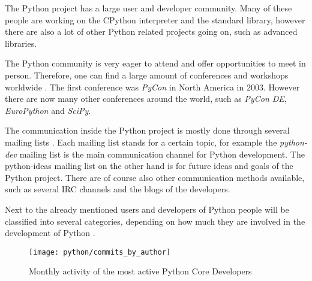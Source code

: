 The Python project has a large user and developer community. Many of these people are
working on the CPython interpreter and the standard library, however there are
also a lot of other Python related projects going on, such as advanced libraries.

The Python community is very eager to attend and offer opportunities to meet in
person. Therefore, one can find a large amount of conferences and workshops
worldwide \cite{PythonConferences}. The first conference was \emph{PyCon} in
North America in 2003. However there are now many other conferences around the
world, such as \emph{PyCon DE}, \emph{EuroPython} and \emph{SciPy}.

The communication inside the Python project is mostly done through several
mailing lists \cite{PythonCommunication}. Each mailing list stands for a
certain topic, for example the \emph{python-dev} mailing list is the main
communication channel for Python development. The python-ideas mailing list on
the other hand is for future ideas and goals of the Python project. There are
of course also other communication methods available, such as several \ac{IRC}
channels and the blogs of the developers.

Next to the already mentioned users and developers of Python people will be
classified into several categories, depending on how much they are involved in
the development of Python \cite{PythonCoreDeveloper}.

\begin{figure}[htbp]
  \centering
  \texttt{[image: python/commits\_by\_author]}
  \caption{Monthly activity of the most active Python Core Developers}
\end{figure}

